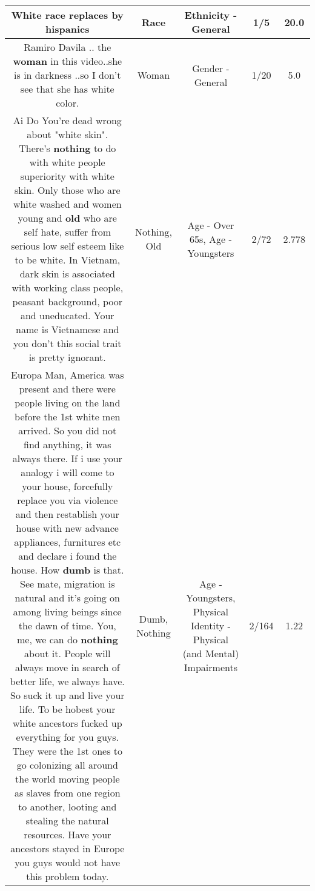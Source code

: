 \documentclass[11pt]{article}
\newlength\mylength
\begin{document}
\begin{center}
\begin{longtable}{|C{.65\mylength}|C{.30\mylength}|C{.12\mylength}|C{.12\mylength}|C{.12\mylength}|}
  \small White \textbf{race} replaces by hispanics\normalsize   & Race & Ethnicity - General & 1/5 & 20.0 \\  \hline
  \small Ramiro Davila .. the \textbf{woman} in this video..she is in darkness ..so I don't see that she has  white color.\normalsize   & Woman & Gender - General & 1/20 & 5.0 \\  \hline
  \small Ai Do You're dead wrong about "white skin". There's \textbf{nothing} to do with white people superiority with white skin. Only those who are white washed and women young and \textbf{old} who are self hate,  suffer from serious low self esteem like to be white. In Vietnam, dark  skin is associated with working class people, peasant background, poor and uneducated. Your name is Vietnamese and you don't this social trait is pretty ignorant.\normalsize   & Nothing, Old & Age - Over 65s, Age - Youngsters & 2/72 & 2.778 \\  \hline
  \small Europa Man, America was present and there were people living on the land before the 1st white men arrived. So you did not find anything, it was always there. If i use your analogy i will come to your house, forcefully replace you via violence and then restablish your house with new advance appliances, furnitures etc and declare i found the house. How \textbf{dumb} is that. See mate, migration is natural and it's going on among living beings since the dawn of time. You, me, we can do \textbf{nothing} about it. People will always move in search of better life, we always have. So suck it up and live your life. To be hobest your white ancestors fucked up everything for you guys. They were the 1st ones to go colonizing all around the world moving people as slaves from one region to another, looting and stealing the natural resources. Have your ancestors stayed in Europe you guys would not have this problem today.\normalsize   & Dumb, Nothing & Age - Youngsters, Physical Identity - Physical (and Mental) Impairments & 2/164 & 1.22 \\  \hline

\end{longtable}
\end{center}
\end{document}
